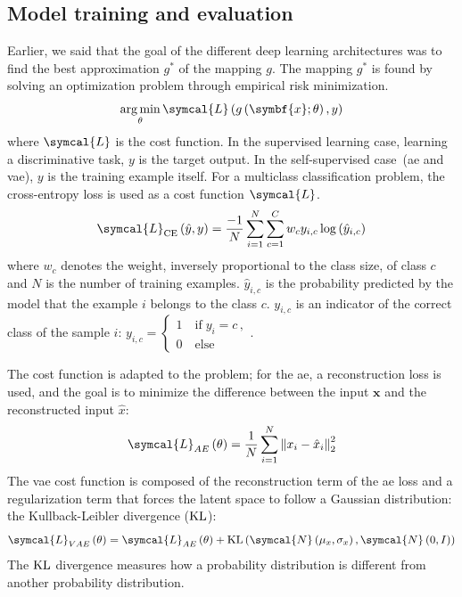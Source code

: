 \documentclass[../main.tex]{subfiles}
\begin{document}
	\subsection{Model training and evaluation}
		Earlier, we said that the goal of the different deep learning architectures was to find the best approximation \(g^{*}\) of the mapping \(g\).
		The mapping \(g^{*}\) is found by solving an optimization problem through empirical risk minimization.
		\begin{equation}
			\argmin_{\theta} \symcal{L}\left(g\left(\symbf{x}; \theta\right), y\right) \label{eq:dl_opt}
		\end{equation}
		where \(\symcal{L}\) is the cost function.
		In the supervised learning case, learning a discriminative task, \(y\) is the target output.
		In the self-supervised case~(\gls{ae} and \gls{vae}), \(y\) is the training example itself.
		For a multiclass classification problem, the cross-entropy loss is used as a cost function \(\symcal{L}\).
		\begin{equation}
			\symcal{L}_{\text{CE}}\left(\hat{y}, y\right) = \frac{-1}{N}\sum_{i=1}^{N}\sum_{c=1}^{C} w_c y_{i,c}\log\left(\hat{y}_{i,c}\right)\label{eq:ce_loss}
		\end{equation}
		where \(w_c\) denotes the weight, inversely proportional to the class size, of class \(c\) and \(N\) is the number of training examples.
		\(\hat{y}_{i,c}\) is the probability predicted by the model that the example \(i\) belongs to the class \(c\).
		\(y_{i,c}\) is an indicator of the correct class of the sample \(i\):
		\(
		y_{i,c} = \begin{cases}
			1 \quad \text{if}\; y_i = c \, , \\
			0 \quad \text{else}
		\end{cases}
		\).

		The cost function is adapted to the problem; for the \gls{ae}, a reconstruction loss is used, and the goal is to minimize the difference between the input \(\symbf{x}\) and the reconstructed input \(\hat{x}\):
		\begin{equation}
			\symcal{L}_{AE}\left(\theta\right) = \frac{1}{N}\sum_{i=1}^{N} {\left\|x_i - \hat{x}_i \right\|}_2^{2} \label{eq:loss_ae}
		\end{equation}
		The \gls{vae} cost function is composed of the reconstruction term of the \gls{ae} loss and a regularization term that forces the latent space to follow a Gaussian distribution: the Kullback-Leibler divergence (\(\operatorname{KL}\)):
		\begin{equation}
			\symcal{L}_{VAE}\left(\theta\right) = \symcal{L}_{AE}\left(\theta\right) + \KL\left(\symcal{N}\left(\mu_{x}, \sigma_{x}\right), \symcal{N}\left(0, I\right)\right)
		\end{equation}
		The \(\operatorname{KL}\) divergence measures how a probability distribution is different from another probability distribution.
\end{document}
